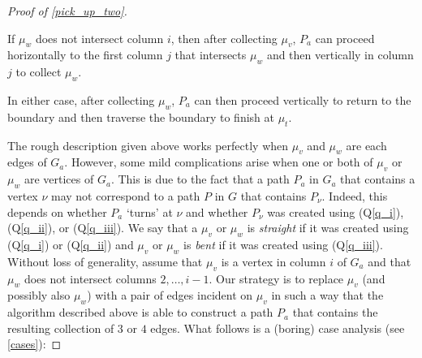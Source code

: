 \documentclass{patmorin}
\newcommand{\defin}[1]{\emph{\color{brightmaroon}#1}}
\begin{document}
\begin{proof}[Proof of \cref{pick_up_two}]
\begin{compactitem}
    \item If $\mu_w$ does not intersect column $i$, then after collecting $\mu_v$, $P_a$ can proceed horizontally to the first column $j$ that intersects $\mu_w$ and then vertically in column $j$ to collect $\mu_w$.
  \end{compactitem}
  In either case, after collecting $\mu_w$, $P_a$ can then proceed vertically to return to the boundary and then traverse the boundary to finish at $\mu_t$.

  The rough description given above works perfectly when $\mu_v$ and $\mu_w$ are each edges of $G_a$.  However, some mild complications arise when one or both of $\mu_v$ or $\mu_w$ are vertices of $G_a$.  This is due to the fact that a path $P_a$ in $G_a$ that contains a vertex $\nu$ may not correspond to a path $P$ in $G$ that contains $P_\nu$.  Indeed, this depends on whether $P_a$ `turns' at $\nu$ and whether $P_\nu$ was created using (Q\ref{q_i}), (Q\ref{q_ii}), or (Q\ref{q_iii}).  We say that a $\mu_v$ or $\mu_w$ is \defin{straight} if it was created using (Q\ref{q_i}) or (Q\ref{q_ii}) and $\mu_v$ or $\mu_w$ is \defin{bent} if it was created using (Q\ref{q_iii}).  Without loss of generality, assume that $\mu_v$ is a vertex in column $i$ of $G_a$ and that $\mu_w$ does not intersect columns $2,\ldots,i-1$.  Our strategy is to replace $\mu_v$ (and possibly also $\mu_w$) with a pair of edges incident on $\mu_v$ in such a way that the algorithm described above is able to construct a path $P_a$ that contains the resulting collection of $3$ or $4$ edges.  What follows is a (boring) case analysis (see \cref{cases}):


\end{proof}
\end{document}
